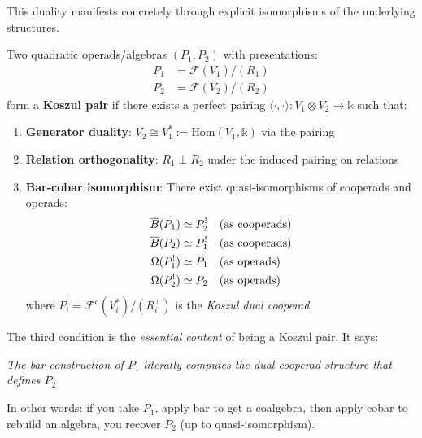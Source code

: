 \begin{example}
\begin{principle}
This duality manifests concretely through explicit isomorphisms of the underlying structures.
\end{principle}

\begin{definition}\label{def:classical-koszul-pair}
Two quadratic operads/algebras $(P_1, P_2)$ with presentations:
\begin{align*}
P_1 &= \mathcal{F}(V_1)/(R_1) \\
P_2 &= \mathcal{F}(V_2)/(R_2)
\end{align*}
form a \textbf{Koszul pair} if there exists a perfect pairing $\langle \cdot, \cdot \rangle: V_1 \otimes V_2 \to \mathbb{k}$ such that:

\begin{enumerate}
\item \textbf{Generator duality}: $V_2 \cong V_1^* := \text{Hom}(V_1, \mathbb{k})$ via the pairing

\item \textbf{Relation orthogonality}: $R_1 \perp R_2$ under the induced pairing on relations

\item \textbf{Bar-cobar isomorphism}: There exist quasi-isomorphisms of cooperads and operads:
\begin{align*}
\overline{B}(P_1) &\simeq P_2^! \quad \text{(as cooperads)} \\
\overline{B}(P_2) &\simeq P_1^! \quad \text{(as cooperads)} \\
\Omega(P_1^!) &\simeq P_1 \quad \text{(as operads)} \\
\Omega(P_2^!) &\simeq P_2 \quad \text{(as operads)}
\end{align*}
where $P_i^! = \mathcal{F}^c(V_i^*)/(R_i^\perp)$ is the \emph{Koszul dual cooperad}.
\end{enumerate}
\end{definition}

\begin{remark}
The third condition is the \emph{essential content} of being a Koszul pair. It says:
\begin{center}
\textit{The bar construction of $P_1$ literally computes the dual cooperad structure that defines $P_2$}
\end{center}

In other words: if you take $P_1$, apply bar to get a coalgebra, then apply cobar to rebuild an algebra, you recover $P_2$ (up to quasi-isomorphism).
\end{remark}


\end{example}
